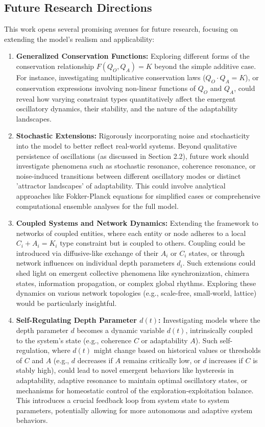 \documentclass[11pt,a4paper]{article}
\begin{document}
\subsection{Future Research Directions}

This work opens several promising avenues for future research, focusing on extending the model's realism and applicability:

\begin{enumerate}
    \item \textbf{Generalized Conservation Functions:} Exploring different forms of the conservation relationship $F(Q_O, Q_A)=K$ beyond the simple additive case. For instance, investigating multiplicative conservation laws ($Q_O \cdot Q_A = K$), or conservation expressions involving non-linear functions of $Q_O$ and $Q_A$, could reveal how varying constraint types quantitatively affect the emergent oscillatory dynamics, their stability, and the nature of the adaptability landscapes.

    \item \textbf{Stochastic Extensions:} Rigorously incorporating noise and stochasticity into the model to better reflect real-world systems. Beyond qualitative persistence of oscillations (as discussed in Section 2.2), future work should investigate phenomena such as stochastic resonance, coherence resonance, or noise-induced transitions between different oscillatory modes or distinct 'attractor landscapes' of adaptability. This could involve analytical approaches like Fokker-Planck equations for simplified cases or comprehensive computational ensemble analyses for the full model.

    \item \textbf{Coupled Systems and Network Dynamics:} Extending the framework to networks of coupled entities, where each entity or node adheres to a local $C_i+A_i=K_i$ type constraint but is coupled to others. Coupling could be introduced via diffusive-like exchange of their $A_i$ or $C_i$ states, or through network influences on individual depth parameters $d_i$. Such extensions could shed light on emergent collective phenomena like synchronization, chimera states, information propagation, or complex global rhythms. Exploring these dynamics on various network topologies (e.g., scale-free, small-world, lattice) would be particularly insightful.

    \item \textbf{Self-Regulating Depth Parameter $d(t)$:} Investigating models where the depth parameter $d$ becomes a dynamic variable $d(t)$, intrinsically coupled to the system's state (e.g., coherence $C$ or adaptability $A$). Such self-regulation, where $d(t)$ might change based on historical values or thresholds of $C$ and $A$ (e.g., $d$ decreases if $A$ remains critically low, or $d$ increases if $C$ is stably high), could lead to novel emergent behaviors like hysteresis in adaptability, adaptive resonance to maintain optimal oscillatory states, or mechanisms for homeostatic control of the exploration-exploitation balance. This introduces a crucial feedback loop from system state to system parameters, potentially allowing for more autonomous and adaptive system behaviors.


\end{enumerate}
\end{document}
